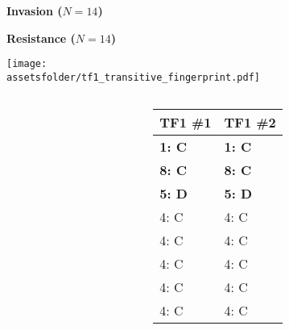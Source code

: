 \documentclass{beamer}
\newcommand{\assetsfolder}{./assets}
\newcommand{\researchfolder}{$HOME/rsc/axelrod-moran}
\begin{document}
\begin{frame}
            \footnotesize
            \begin{center}
                \textbf{Invasion (\(N=14\))}\\

                
            \end{center}
\end{frame}
\begin{frame}
            \footnotesize
            \begin{center}
                \textbf{Resistance (\(N=14\))}\\

                
            \end{center}
\end{frame}


\begin{frame}
    \begin{center}
        \texttt{[image: \\assetsfolder/tf1\_transitive\_fingerprint.pdf]}
    \end{center}
\end{frame}

\begin{frame}
    \begin{columns}
        \begin{column}{.6\textwidth}
            \begin{center}
                \scalebox{.49}{
                    
                }
            \end{center}
        \end{column}

        \begin{column}{.4\textwidth}
            \small
            \begin{tabular}{ll}
                \toprule
                TF1 \#1   & TF1 \#2\\
                \midrule
                \bf{1}: C & \bf{1}: C  \\
                \bf{8}: C & \bf{8}: C  \\
                \bf{5}: D & \bf{5}: D  \\
                4: C      & 4: C  \\
                4: C      & 4: C  \\
                4: C      & 4: C  \\
                4: C      & 4: C  \\
                4: C      & 4: C  \\
                \bottomrule
            \end{tabular}
        \end{column}
    \end{columns}
\end{frame}
\end{document}
